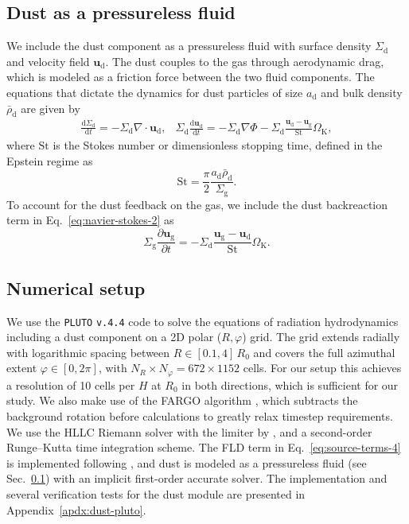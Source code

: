 \documentclass[fleqn,usenatbib,useAMS]{mnras}
\newcommand{\DP}[2]{\frac{\partial{#1}}{\partial{#2}}}
\newcommand{\D}[2]{\frac{\text{d}{#1}}{\text{d}{#2}}}
\newcommand{\OmegaK}{\Omega_\mathrm{K}}
\newcommand{\vel}{\bm{u}}
\newcommand{\Sigmag}{\Sigma_\mathrm{g}}
\newcommand{\Sigmad}{\Sigma_\mathrm{d}}
\newcommand{\velg}{\vel_\mathrm{g}}
\newcommand{\veld}{\vel_\mathrm{d}}
\newcommand{\St}{\mathrm{St}}
\newcommand{\ad}{a_\mathrm{d}}
\newcommand{\brhod}{\bar{\rho}_\mathrm{d}}
\newcommand{\pluto}{\texttt{PLUTO}}
\begin{document}
\subsection{Dust as a pressureless fluid}
\label{sub:dust-model}

We include the dust component as a pressureless fluid with surface density $\Sigmad$ and velocity field $\veld$. The dust couples to the gas through aerodynamic drag, which is modeled as a friction force between the two fluid components. The equations that dictate the dynamics for dust particles of size $\ad$ and bulk density $\brhod$ are given by
%
\begin{subequations}
	\label{eq:dust-evolution}
	\begin{align}
		\label{eq:dust-evolution-1}
		\D{\Sigmad}{t} = -\Sigmad\nabla\cdot\veld,
	\end{align}
	\begin{align}
		\label{eq:dust-evolution-2}
		\Sigmad\D{\veld}{t} = - \Sigmad\nabla\Phi - \Sigmad\frac{\veld-\velg}{\St}\OmegaK,
	\end{align}
\end{subequations}
%
where $\St$ is the Stokes number or dimensionless stopping time, defined in the Epstein regime as \citep[e.g.,][]{armitage-2009}
%
\begin{equation}
	\label{eq:stokes-number}
	\St = \frac{\pi}{2}\frac{\ad\brhod}{\Sigmag}.
\end{equation}
%
To account for the dust feedback on the gas, we include the dust backreaction term in Eq.~\eqref{eq:navier-stokes-2} as
%
\begin{equation}
	\label{eq:back-reaction}
	\Sigmag\DP{\velg}{t} = - \Sigmad\frac{\velg-\veld}{\St}\OmegaK.
\end{equation}

\subsection{Numerical setup}
\label{sub:numerics}

We use the \pluto{} \texttt{v.4.4} code \citep{mignone-etal-2007} to solve the equations of radiation hydrodynamics including a dust component on a 2D polar ($R,\varphi$) grid. The grid extends radially with logarithmic spacing between $R\in[0.1,4]$\,$R_0$ and covers the full azimuthal extent $\varphi\in[0,2\pi]$, with $N_R\times N_\varphi=672\times1152$ cells. For our setup this achieves a resolution of 10 cells per $H$ at $R_0$ in both directions, which is sufficient for our study. We also make use of the FARGO algorithm \citep{masset-2000,mignone-etal-2012}, which subtracts the background rotation before calculations to greatly relax timestep requirements. We use the HLLC Riemann solver \citep{toro-etal-1994} with the limiter by \citet{vanleer-1974}, and a second-order Runge--Kutta time integration scheme. The FLD term in Eq.~\eqref{eq:source-terms-4} is implemented following \citet{ziampras-etal-2020a}, and dust is modeled as a pressureless fluid (see Sec.~\ref{sub:dust-model}) with an implicit first-order accurate solver. The implementation and several verification tests for the dust module are presented in Appendix~\ref{apdx:dust-pluto}.
\end{document}

